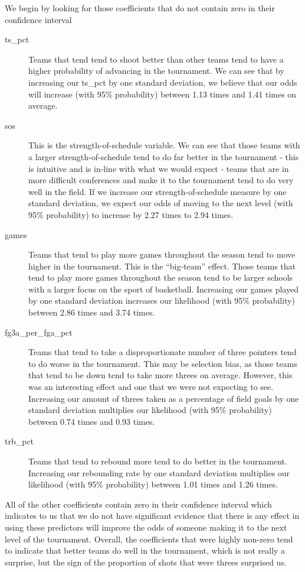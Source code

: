 \documentclass[10pt,a4paper, hidelinks]{article} %
\begin{document}
We begin by looking for those coefficients that do not contain zero in their confidence interval
\begin{description}
	\item[ts\_pct] Teams that tend tend to shoot better than other teams tend to have a higher probability of advancing in the tournament. We can see that by increasing our ts\_pct by one standard deviation, we believe that our odds will increase  (with 95\% probability)  between 1.13 times and 1.41 times on average. 
	\item[sos] This is the strength-of-schedule variable. We can see that those teams with a larger strength-of-schedule tend to do far better in the tournament - this is intuitive and is in-line with what we would expect - teams that are in more difficult conferences and make it to the tournament tend to do very well in the field.  If we increase our strength-of-schedule measure by one standard deviation, we expect our odds of moving to the next level (with 95\% probability) to increase by 2.27 times to 2.94 times.
	\item[games] Teams that tend to play more games throughout the season tend to move higher in the tournament. This is the ``big-team'' effect. Those teams that tend to play more games throughout the season tend to be larger schools with a larger focus on the sport of basketball. Increasing our games played by one standard deviation increases our likelihood (with 95\% probability) between 2.86 times and 3.74 times. 
	\item[fg3a\_per\_fga\_pct] Teams that tend to take a disproportionate number of three pointers tend to do worse in the tournament. This may be selection bias, as those teams that tend to be down tend to take more threes on average. However, this was an interesting effect and one that we were not expecting to see. Increasing our amount of threes taken as a percentage of field goals by one standard deviation multiplies our likelihood (with 95\% probability) between 0.74 times and 0.93 times. 
	\item[trb\_pct] Teams that tend to rebound more tend to do better in the tournament. Increasing our rebounding rate by one standard deviation multiplies our likelihood (with 95\% probability) between 1.01 times and 1.26 times. 
\end{description}
All of the other coefficients contain zero in their confidence interval which indicates to us that we do not have significant evidence that there is any effect in using these predictors will improve the odds of someone making it to the next level of the tournament. Overall, the coefficients that were highly non-zero tend to indicate that better teams do well in the tournament, which is not really a surprise, but the sign of the proportion of shots that were threes surprised us. 
\end{document}
